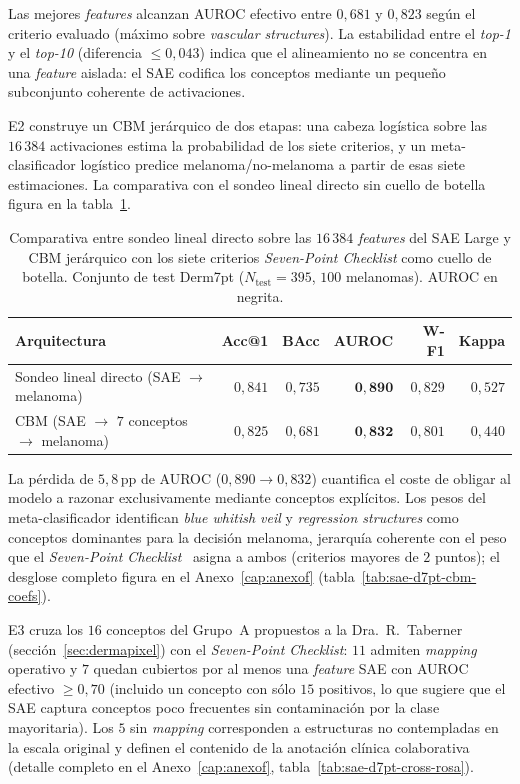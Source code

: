 Las mejores \emph{features} alcanzan AUROC efectivo entre $0{,}681$ y
$0{,}823$ según el criterio evaluado (máximo sobre \emph{vascular
structures}). La estabilidad entre el \emph{top-1} y el \emph{top-10}
(diferencia $\leq 0{,}043$) indica que el alineamiento no se concentra
en una \emph{feature} aislada: el SAE codifica los conceptos mediante un
pequeño subconjunto coherente de activaciones.

E2 construye un CBM jerárquico de dos etapas: una cabeza logística
sobre las $16\,384$ activaciones estima la probabilidad de los siete
criterios, y un meta-clasificador logístico predice
melanoma/no-melanoma a partir de esas siete estimaciones. La
comparativa con el sondeo lineal directo sin cuello de botella figura
en la tabla~\ref{tab:sae-d7pt-cbm}.

\begin{table}[H]
\centering
\footnotesize
\setlength{\tabcolsep}{4pt}
\renewcommand{\arraystretch}{0.95}
\caption{Comparativa entre sondeo lineal directo sobre las
$16\,384$ \emph{features} del SAE Large y CBM jerárquico con
los siete criterios \emph{Seven-Point Checklist} como cuello de
botella. Conjunto de test Derm7pt
($N_{\mathrm{test}} = 395$, $100$ melanomas). AUROC en
negrita.}
\label{tab:sae-d7pt-cbm}
\begin{tabular}{lrrrrr}
\hline
Arquitectura                                & Acc@1     & BAcc      & AUROC              & W-F1      & Kappa     \\
\hline
Sondeo lineal directo (SAE $\to$ melanoma)  & $0{,}841$ & $0{,}735$ & $\mathbf{0{,}890}$ & $0{,}829$ & $0{,}527$ \\
CBM (SAE $\to$ $7$ conceptos $\to$ melanoma) & $0{,}825$ & $0{,}681$ & $\mathbf{0{,}832}$ & $0{,}801$ & $0{,}440$ \\
\hline
\end{tabular}
\end{table}

La pérdida de $5{,}8$\,pp de AUROC ($0{,}890 \to 0{,}832$) cuantifica el
coste de obligar al modelo a razonar exclusivamente mediante conceptos
explícitos. Los pesos del meta-clasificador identifican \emph{blue
whitish veil} y \emph{regression structures} como conceptos dominantes
para la decisión melanoma, jerarquía coherente con el peso que el
\emph{Seven-Point Checklist}~\cite{kawahara2019} asigna a ambos
(criterios mayores de $2$ puntos); el desglose completo figura en el
Anexo~\ref{cap:anexof} (tabla~\ref{tab:sae-d7pt-cbm-coefs}).

E3 cruza los $16$ conceptos del Grupo~A propuestos a la
Dra.~R.~Taberner (sección~\ref{sec:dermapixel}) con el \emph{Seven-Point
Checklist}: $11$ admiten \emph{mapping} operativo y $7$ quedan cubiertos
por al menos una \emph{feature} SAE con AUROC efectivo $\geq 0{,}70$
(incluido un concepto con sólo $15$ positivos, lo que sugiere que el SAE
captura conceptos poco frecuentes sin contaminación por la clase
mayoritaria). Los $5$ sin \emph{mapping} corresponden a estructuras no
contempladas en la escala original y definen el contenido de la
anotación clínica colaborativa (detalle completo en el
Anexo~\ref{cap:anexof}, tabla~\ref{tab:sae-d7pt-cross-rosa}).

